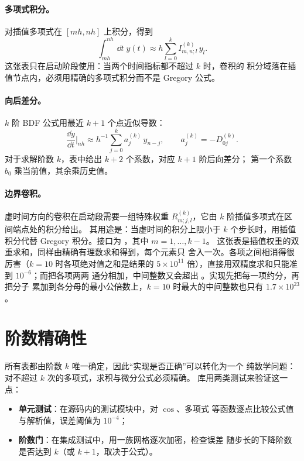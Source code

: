 \paragraph{多项式积分。}
对插值多项式在 $[mh,nh]$ 上积分，得到
\begin{equation}
    \int^{nh}_{mh}\!\dd t\;y(t)
    \approx h\sum^{k}_{l=0} I^{(k)}_{m,n;l}\,y_l .
    \label{eq:poly-int}
\end{equation}
这张表只在启动阶段使用：当两个时间指标都不超过 $k$ 时，卷积的
积分域落在插值节点内，必须用精确的多项式积分而不是 Gregory 公式。

\paragraph{向后差分。}
$k$ 阶 BDF 公式用最近 $k+1$ 个点近似导数：
\begin{equation}
    \frac{\dd y}{\dd t}\Big|_{nh}
    \approx h^{-1}\sum^{k}_{j=0} a^{(k)}_j\,y_{n-j},
    \qquad a^{(k)}_j = -D^{(k)}_{0j}.
    \label{eq:bdf}
\end{equation}
对于求解阶数 $k$，表中给出 $k+2$ 个系数，对应 $k+1$ 阶后向差分；
第一个系数 $b_0$ 乘当前值，其余乘历史值。

\paragraph{边界卷积。}
虚时间方向的卷积在启动段需要一组特殊权重
$R^{(k)}_{m;j,l}$，它由 $k$ 阶插值多项式在区间端点处的积分给出。
其用途是：当虚时间的积分上限小于 $k$ 个步长时，用插值积分代替
Gregory 积分。接口为 ，其中 $m=1,\dots,k-1$。
这张表是插值权重的双重求和，同样由精确有理数求和得到，每个元素只
舍入一次。各项之间相消得很厉害（$k=10$ 时各项绝对值之和是结果的
$5\times10^{11}$ 倍），直接用双精度求和只能准到 $10^{-6}$；而把各项两两
通分相加，中间整数又会超出 。实现先把每一项约分，再把分子
累加到各分母的最小公倍数上，$k=10$ 时最大的中间整数也只有
$1.7\times10^{23}$。

\section{阶数精确性}
\label{sec:order-gate}

所有表都由阶数 $k$ 唯一确定，因此“实现是否正确”可以转化为一个
纯数学问题：对不超过 $k$ 次的多项式，求积与微分公式必须精确。
库用两类测试来验证这一点：
\begin{itemize}
    \item \textbf{单元测试}：在源码内的测试模块中，对 $\cos$、多项式
          等函数逐点比较公式值与解析值，误差阈值为 $10^{-4}$；
    \item \textbf{阶数门}：在集成测试中，用一族网格逐次加密，检查误差
          随步长的下降阶数是否达到 $k$（或 $k+1$，取决于公式）。
\end{itemize}

